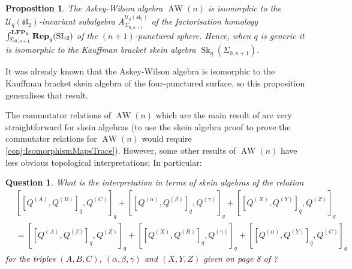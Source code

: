 \documentclass{article}
\newcommand{\catname}[1]{{\normalfont\textbf{#1}}}
\newcommand{\LFP}{\catname{LFP}}
\newcommand{\Rep}{\catname{Rep}}
\newcommand{\Sk}{\operatorname{Sk}}
\newcommand{\AW}{\operatorname{AW}}
\newcommand{\SL}{\operatorname{SL}}
\newcommand{\slgroup}{\mathfrak{sl}}
\newtheorem{prop}[thm]{Proposition}
\newtheorem{qs}[thm]{Question}
\begin{document}
\begin{prop}
The Askey-Wilson algebra $\AW(n)$ is isomorphic to the $\mathcal{U}_q(\slgroup_2)$-invariant subalgebra $A_{\Sigma_{0,n+1}}^{\mathcal{U}_q(\slgroup_2)}$  of the factorisation homology $\int^{\LFP_k}_{\Sigma_{0, n+1}} \Rep_{q}(\SL_2)$ of the $(n+1)$-punctured sphere. Hence, when $q$ is generic it is isomorphic to the Kauffman bracket skein algebra $\Sk_q(\Sigma_{0, n+1})$. 
\end{prop}

It was already known that the Askey-Wilson algebra is isomorphic to the Kauffman bracket skein algebra of the four-punctured surface, so this proposition generalises that result.  

The commutator relations of $\AW(n)$ which are the main result of \cite{DeClercqHadweijch19} are very straightforward for skein algebras (to use the skein algebra proof to prove the commutator relations for $\AW(n)$ would require \cref{conj:IsomorphismMapsTrace}). However, some other results of $\AW(n)$ have less obvious topological interpretations; In particular:

\begin{qs} What is the interpretation in terms of skein algebras of the relation 
\begin{align*}
&[[Q^{(A)}, Q^{(B)}]_q, Q^{(C)}]_q 
+ [[Q^{(\alpha)}, Q^{(\beta)}]_q, Q^{(\gamma)}]_q 
+ [[Q^{(X)}, Q^{(Y)}]_q, Q^{(Z)}]_q \\
&= [[Q^{(A)}, Q^{(\beta)}]_q, Q^{(Z)}]_q
+ [[Q^{(X)}, Q^{(B)}]_q, Q^{(\gamma)}]_q
+ [[Q^{(\alpha)}, Q^{(Y)}]_q, Q^{(C)}]_q 
\end{align*}
for the triples $(A,B,C)$, $(\alpha, \beta, \gamma)$ and $(X,Y,Z)$ given on page 8 of \cite{PostWalter}?
\end{qs}

\printbibliography
\end{document}
